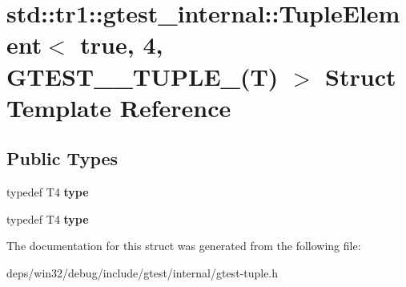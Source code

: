 \hypertarget{structstd_1_1tr1_1_1gtest__internal_1_1_tuple_element_3_01true_00_014_00_01_g_t_e_s_t__10___t_u_p_l_e___07_t_08_01_4}{}\section{std\+:\+:tr1\+:\+:gtest\+\_\+internal\+:\+:Tuple\+Element$<$ true, 4, G\+T\+E\+S\+T\+\_\+\_\+\+T\+U\+P\+L\+E\+\_\+(T) $>$ Struct Template Reference}
\label{structstd_1_1tr1_1_1gtest__internal_1_1_tuple_element_3_01true_00_014_00_01_g_t_e_s_t__10___t_u_p_l_e___07_t_08_01_4}
\subsection*{Public Types}
\begin{DoxyCompactItemize}
\item 
\hypertarget{structstd_1_1tr1_1_1gtest__internal_1_1_tuple_element_3_01true_00_014_00_01_g_t_e_s_t__10___t_u_p_l_e___07_t_08_01_4_a8603bb94254b60248157a92e486b2d62}{}typedef T4 {\bfseries type}\label{structstd_1_1tr1_1_1gtest__internal_1_1_tuple_element_3_01true_00_014_00_01_g_t_e_s_t__10___t_u_p_l_e___07_t_08_01_4_a8603bb94254b60248157a92e486b2d62}

\item 
\hypertarget{structstd_1_1tr1_1_1gtest__internal_1_1_tuple_element_3_01true_00_014_00_01_g_t_e_s_t__10___t_u_p_l_e___07_t_08_01_4_a8603bb94254b60248157a92e486b2d62}{}typedef T4 {\bfseries type}\label{structstd_1_1tr1_1_1gtest__internal_1_1_tuple_element_3_01true_00_014_00_01_g_t_e_s_t__10___t_u_p_l_e___07_t_08_01_4_a8603bb94254b60248157a92e486b2d62}

\end{DoxyCompactItemize}


The documentation for this struct was generated from the following file\+:\begin{DoxyCompactItemize}
\item 
deps/win32/debug/include/gtest/internal/gtest-\/tuple.\+h\end{DoxyCompactItemize}
